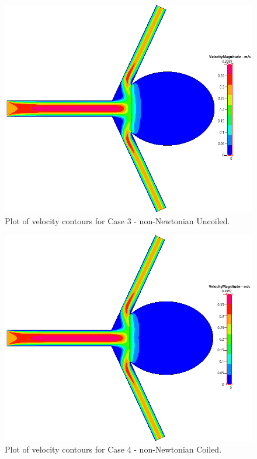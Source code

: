 \documentclass[journal,twoside,web]{ieeecolor}
\begin{document}
\begin{figure}[!t]
    \centerline{\includegraphics[width=\columnwidth]{img/geom16Velocity.png}}
    \caption{Plot of velocity contours for Case 3 - non-Newtonian Uncoiled.}
    \label{geom16V}
\end{figure}
\begin{figure}[!t]
    \centerline{\includegraphics[width=\columnwidth]{img/geom18Velocity.png}}
    \caption{Plot of velocity contours for Case 4 - non-Newtonian Coiled.}
    \label{geom18V}
\end{figure}
\end{document}
